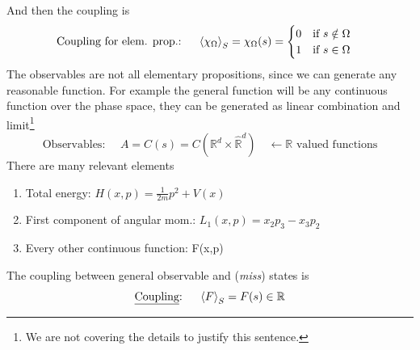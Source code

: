 \documentclass[../main.tex]{subfiles}
\begin{document}
And then the coupling is
\[
    \textrm{Coupling for elem. prop.: } \quad \expval{\chi_\Omega}_S= \chi_\Omega(s) = \begin{cases}
    0 \quad \textrm{if} \ s \notin \Omega\\
    1 \quad \textrm{if} \ s \in \Omega
    \end{cases}
\]
The observables are not all elementary propositions, since we can generate any reasonable function. For example the general function will be any continuous function over the phase space, they can be generated as linear combination and limit\footnote{We are not covering the details to justify this sentence.}
\[
    \textrm{Observables: } \quad A=C(s) = C\left(\mathbb{R}^d\times\hat{\mathbb{R}}^d\right) \quad \leftarrow\textrm{$\mathbb{R}$ valued functions}
\]
There are many relevant elements
\begin{enumerate}
    \item Total energy: \(H(x,p)=\frac{1}{2m}p^2+V(x)\)
    \item First component of angular mom.: \(L_1(x,p)=x_2p_3-x_3p_2\)
    \item Every other continuous function: F(x,p)
\end{enumerate}
The coupling between general observable and (\textit{miss}) states is
\[
    \textrm{\underline{Coupling}: } \quad \expval{F}_S= F(s)\in\mathbb{R}
\]
\end{document}
